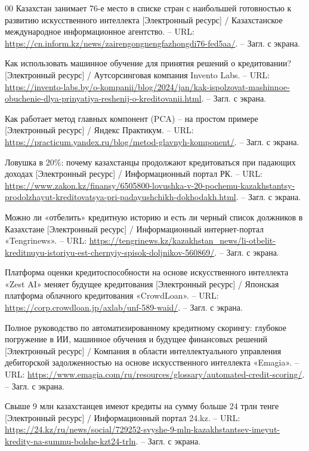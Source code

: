 \begin{thebibliography}{00}
	 Казахстан занимает 76-е место в списке стран с наибольшей готовностью к развитию искусственного интеллекта [Электронный ресурс] / Казахстанское международное информационное агентство. -- URL: \url{https://cn.inform.kz/news/zairengongnengfazhongdi76-fed5aa/}. -- Загл. с экрана.
	
	 Как использовать машинное обучение для принятия решений о кредитовании?  [Электронный ресурс] / Аутсорсинговая компания Invento Labs. -- URL: \url{https://invento-labs.by/o-kompanii/blog/2024/jan/kak-ispolzovat-mashinnoe-obuchenie-dlya-prinyatiya-reshenij-o-kreditovanii.html}. -- Загл. с экрана.
	
	 Как работает метод главных компонент (PCA) -- на простом примере  [Электронный ресурс] / Яндекс Практикум. -- URL: \url{https://practicum.yandex.ru/blog/metod-glavnyh-komponent/}. -- Загл. с экрана.
	
	 Ловушка в 20\%: почему казахстанцы продолжают кредитоваться при падающих доходах [Электронный ресурс] / Информационный портал РК. -- URL: \url{https://www.zakon.kz/finansy/6505800-lovushka-v-20-pochemu-kazakhstantsy-prodolzhayut-kreditovatsya-pri-padayushchikh-dokhodakh.html}. -- Загл. с экрана.
	
	 Можно ли «отбелить» кредитную историю и есть ли черный список должников в Казахстане [Электронный ресурс] / Информационный интернет-портал «Tengrinews». -- URL: \url{https://tengrinews.kz/kazakhstan_news/li-otbelit-kreditnuyu-istoriyu-est-chernyiy-spisok-doljnikov-560869/}. -- Загл. с экрана.
	
	 Платформа оценки кредитоспособности на основе искусственного интеллекта «Zest AI» меняет будущее кредитования [Электронный ресурс] / Японская платформа облачного кредитования «CrowdLoan». -- URL: \url{https://corp.crowdloan.jp/axlab/unf-589-waid/}. -- Загл. с экрана.
	
	 Полное руководство по автоматизированному кредитному скорингу: глубокое погружение в ИИ, машинное обучения и будущее финансовых решений [Электронный ресурс] / Компания в области интеллектуального управления дебиторской задолженностью на основе искусственного интеллекта «Emagia». -- URL: \url{https://www.emagia.com/ru/resources/glossary/automated-credit-scoring/}. -- Загл. с экрана.
	
	 Свыше 9 млн казахстанцев имеют кредиты на сумму больше 24 трлн тенге [Электронный ресурс] / Информационный портал 24.kz. -- URL: \url{https://24.kz/ru/news/social/729252-svyshe-9-mln-kazakhstantsev-imeyut-kredity-na-summu-bolshe-kzt24-trln}. -- Загл. с экрана.
	

\end{thebibliography}
